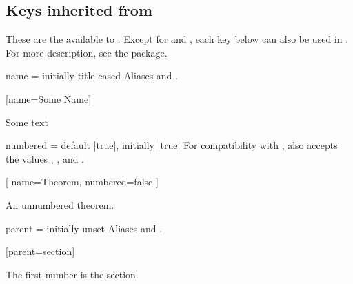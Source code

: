 \documentclass{ltxdoc}
\begin{document}
\subsection{Keys inherited from } \label{thm-thmtools-keys}

These are the  available to .
Except for  and , each key below can also be used in .
For more description, see the \href{https://ctan.org/pkg/thmtools}{} package.

\begin{docKey}[][doc label=thm/name]{name}
  {=}
  {initially title-cased }
Aliases  and .

\begin{tcbwritetemp}
[name=Some Name]
\end{tcbwritetemp}

\begin{keythmscode}[withpreamble]
\begin{mythm}
Some text
\end{mythm}
\end{keythmscode}

\end{docKey}

\begin{docKey}{numbered}
  {=\textbar{}\textbar {}}
  {default |true|, initially |true|}
For compatibility with , also accepts the values , , and .

\begin{tcbwritetemp}
[
  name=Theorem, numbered=false
  ]
\end{tcbwritetemp}

\begin{keythmscode}[withpreamble]
\begin{theorem*}
An unnumbered theorem.
\end{theorem*}
\end{keythmscode}

\end{docKey}

\begin{docKey}{parent}
  {=}
  {initially unset}
Aliases  and .

\begin{tcbwritetemp}
[parent=section]
\end{tcbwritetemp}

\begin{keythmscode}[withpreamble]
\begin{conjecture}
The first number is the section.
\end{conjecture}
\end{keythmscode}

\end{docKey}
\end{document}
